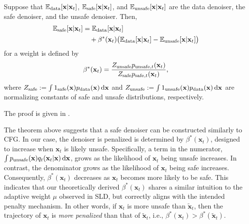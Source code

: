 \begin{theorem}\label{thm:safe}
Suppose that $\mathbb{E}_{\textup{data}}[\mathbf{x}\vert\mathbf{x}_{t}]$, $\mathbb{E}_{\textup{safe}}[\mathbf{x}\vert\mathbf{x}_{t}]$, and $\mathbb{E}_{\textup{unsafe}}[\mathbf{x}\vert\mathbf{x}_{t}]$ are the data denoiser, the safe denoiser, and the unsafe denoiser. Then,
    \begin{align}\label{eq:E_safe}
        \mathbb{E}_{\textup{safe}}[\mathbf{x}\vert\mathbf{x}_{t}]&=\mathbb{E}_{\textup{data}}[\mathbf{x}\vert\mathbf{x}_{t}]\\
        &\quad+\beta^{*}(\mathbf{x}_{t})\big(\mathbb{E}_{\textup{data}}[\mathbf{x}\vert\mathbf{x}_{t}]-\mathbb{E}_{\textup{unsafe}}[\mathbf{x}\vert\mathbf{x}_{t}]\big) \nonumber
    \end{align}
    for a weight is defined by
    \begin{align}\label{eq:beta}
        \beta^{*}(\mathbf{x}_{t}) = \frac{Z_{\textup{unsafe}}p_{\textup{unsafe},t}(\mathbf{x}_{t})}{Z_{\textup{safe}}p_{\textup{safe},t}(\mathbf{x}_{t})},
    \end{align}
    where $Z_{\textup{safe}}:=\int 1_{\textup{safe}}(\mathbf{x})p_{\textup{data}}(\mathbf{x})\mathop{}\!\mathrm{d}\mathbf{x}$ and $Z_{\textup{unsafe}}:=\int 1_{\textup{unsafe}}(\mathbf{x})p_{\textup{data}}(\mathbf{x})\mathop{}\!\mathrm{d}\mathbf{x}$ are normalizing constants of safe and unsafe distributions, respectively.
\end{theorem}
The proof is given in .



%
%
%
%
%
%
%
%
%
%
%
%

The theorem above suggests that a safe denoiser can be constructed similarly to CFG. 
%
%
In our case, the denoiser is penalized is determined by $\beta^{*}(\mathbf{x}_{t})$, designed to increase when $\mathbf{x}_{t}$ is likely unsafe. Specifically, a term in the numerator, $\int p_{\text{unsafe}}(\mathbf{x}) q_{t}(\mathbf{x}_{t} \vert \mathbf{x})\mathop{}\!\mathrm{d}\mathbf{x}$, grows as the likelihood of $\mathbf{x}_{t}$ being unsafe increases. In contrast, the denominator grows as the likelihood of $\mathbf{x}_{t}$ being safe increases. Consequently, $\beta^{*}(\mathbf{x}_{t})$ decreases as $\mathbf{x}_{t}$ becomes more likely to be safe. This indicates that our theoretically derived $\beta^{*}(\mathbf{x}_{t})$ shares a similar intuition to the adaptive weight $\mu$ observed in SLD, but correctly aligns with the intended penalty mechanism. In other words, if $\mathbf{x}_{t}$ is more unsafe than $\mathbf{\tilde{x}}_{t}$, then the trajectory of $\mathbf{x}_{t}$ is \textit{more penalized} than that of $\mathbf{\tilde{x}}_{t}$, i.e., $\beta^{*}(\mathbf{x}_{t})>\beta^{*}(\mathbf{\tilde{x}}_{t})$.

